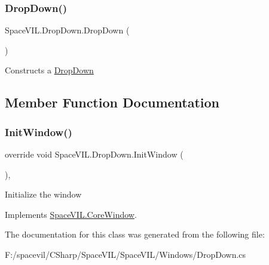 \subsubsection{\texorpdfstring{Drop\+Down()}{DropDown()}}
{\footnotesize\ttfamily Space\+V\+I\+L.\+Drop\+Down.\+Drop\+Down (\begin{DoxyParamCaption}{ }\end{DoxyParamCaption})\hspace{0.3cm}{\ttfamily [inline]}}



Constructs a \mbox{\hyperlink{class_space_v_i_l_1_1_drop_down}{Drop\+Down}} 



\subsection{Member Function Documentation}
\mbox{\label{class_space_v_i_l_1_1_drop_down_a291f706e5ec6558798d20fa428b2ba91}} 
\subsubsection{\texorpdfstring{Init\+Window()}{InitWindow()}}
{\footnotesize\ttfamily override void Space\+V\+I\+L.\+Drop\+Down.\+Init\+Window (\begin{DoxyParamCaption}{ }\end{DoxyParamCaption})\hspace{0.3cm}{\ttfamily [inline]}, {\ttfamily [virtual]}}



Initialize the window 



Implements \mbox{\hyperlink{class_space_v_i_l_1_1_core_window_aa3cf4ac54d9651b1149584dc81042824}{Space\+V\+I\+L.\+Core\+Window}}.



The documentation for this class was generated from the following file\+:\begin{DoxyCompactItemize}
\item 
F\+:/spacevil/\+C\+Sharp/\+Space\+V\+I\+L/\+Space\+V\+I\+L/\+Windows/Drop\+Down.\+cs\end{DoxyCompactItemize}
